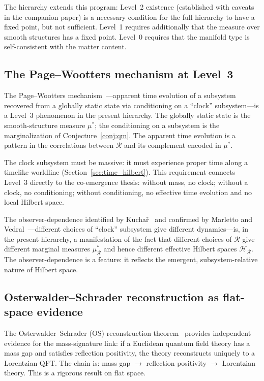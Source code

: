 \documentclass[12pt,a4paper]{article}
\theoremstyle{definition}
\theoremstyle{remark}
\begin{document}
The hierarchy extends this program: Level~2 existence (established with
caveats in the companion paper) is a necessary condition for the full
hierarchy to have a fixed point, but not sufficient. Level~1 requires
additionally that the measure over smooth structures has a fixed point.
Level~0 requires that the manifold type is self-consistent with the
matter content.

\subsection{The Page--Wootters mechanism at Level~3}

The Page--Wootters mechanism~\cite{page_wootters}---apparent time
evolution of a subsystem recovered from a globally static state via
conditioning on a ``clock'' subsystem---is a Level~3 phenomenon in the
present hierarchy. The globally static state is the smooth-structure
measure $\mu^*$; the conditioning on a subsystem is the marginalization
of Conjecture~\ref{conj:qm}. The apparent time evolution is a pattern
in the correlations between $\mathcal{R}$ and its complement encoded in
$\mu^*$.

The clock subsystem must be massive: it must experience proper time
along a timelike worldline (Section~\ref{sec:time_hilbert}). This
requirement connects Level~3 directly to the co-emergence thesis:
without mass, no clock; without a clock, no conditioning; without
conditioning, no effective time evolution and no local Hilbert space.

The observer-dependence identified by Kucha\v{r}~\cite{kuchar} and
confirmed by Marletto and Vedral~\cite{marletto_vedral}---different
choices of ``clock'' subsystem give different dynamics---is, in the
present hierarchy, a manifestation of the fact that different choices
of $\mathcal{R}$ give different marginal measures $\mu^*_\mathcal{R}$
and hence different effective Hilbert spaces
$\mathcal{H}_\mathcal{R}$. The observer-dependence is a feature:
it reflects the emergent, subsystem-relative nature of Hilbert space.

\subsection{Osterwalder--Schrader reconstruction as flat-space evidence}

The Osterwalder--Schrader (OS) reconstruction
theorem~\cite{osterwalder_schrader} provides independent evidence for the
mass-signature link: if a Euclidean quantum field theory has a mass gap
and satisfies reflection positivity, the theory reconstructs uniquely to
a Lorentzian QFT. The chain is: mass gap $\to$ reflection positivity
$\to$ Lorentzian theory. This is a rigorous result on flat space.
\end{document}
